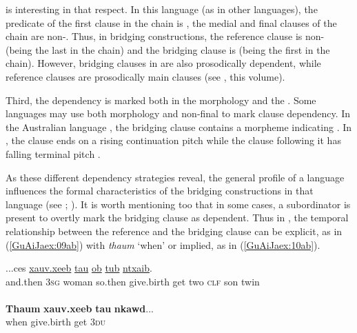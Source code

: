 \documentclass[output=paper]{LSP/langsci}
\begin{document}
 is interesting in that respect. In this language (as in other  languages), the predicate of the first clause in the chain is , the medial and final clauses of the chain are non-. Thus, in  bridging constructions, the reference clause is non- (being the last in the chain) and the bridging clause is  (being the first in the chain). However, bridging clauses in  are also prosodically dependent, while reference clauses are prosodically main clauses (see \citeauthor{sarvasy18}, this volume).

Third, the dependency is marked both in the morphology and the . Some languages may use both morphology and non-final  to mark clause dependency. In the Australian language , the bridging clause contains a morpheme indicating . In , the clause ends on a rising continuation pitch while the clause following it has falling terminal pitch \citep[99]{heath1985}. 

As these different dependency strategies reveal, the general profile of a language influences the formal characteristics of the bridging constructions in that language (see  \citealt{devries.2005}; \citealt[][898]{seifart10}). It is worth mentioning too that in some cases, a subordinator is present to overtly mark the bridging clause as dependent. Thus in , the temporal relationship between the reference and the bridging clause can be explicit, as in (\ref{GuAiJaex:09ab}) with \textit{thaum} `when' or implied, as in (\ref{GuAiJaex:10ab}). 


\begin{exe}
\ex \label{GuAiJaex:09ab}
\begin{xlist}
\ex \label{GuAiJaex:09a}
\gll ...ces \underline{} \underline{} \underline{} \underline{xauv.xeeb} \underline{tau} \underline{ob} \underline{} \underline{tub} \underline{ntxaib}.\\
and.then 3\textsc{sg} woman so.then give.birth get two \textsc{clf} son twin\\
\glt {}\\
\ex \label{GuAiJaex:09b}
\gll \textbf{Thaum} \textbf{xauv.xeeb} \textbf{tau} \textbf{nkawd}...\\     	      
    when  give.birth get 3\textsc{du}\\
\glt {} 
\end{xlist}
\end{exe}
\end{document}
